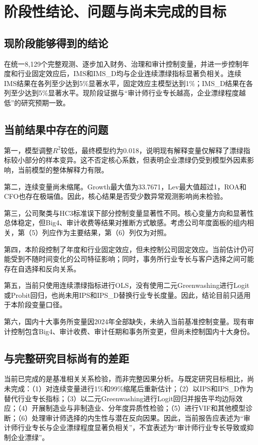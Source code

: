 \documentclass[UTF8,12pt,a4paper]{ctexart}
\begin{document}
\section{阶段性结论、问题与尚未完成的目标}

\subsection{现阶段能够得到的结论}

在统一8,129个完整观测、逐步加入财务、治理和审计控制变量，并进一步控制年度和行业固定效应后，IMS和IMS\_D均与企业连续漂绿指标显著负相关。连续IMS结果在各列至少达到5\%显著水平，固定效应主模型达到1\%；IMS\_D结果在各列至少达到5\%显著水平。现阶段证据与“审计师行业专长越高，企业漂绿程度越低”的研究预期一致。

\subsection{当前结果中存在的问题}

第一，模型调整$R^2$较低，最终模型约为0.018，说明现有解释变量仅解释了漂绿指标较小部分的样本变异。这不否定核心系数，但表明企业漂绿仍受到模型外因素影响，当前模型的整体解释力有限。

第二，连续变量尚未缩尾。Growth最大值为33.7671，Lev最大值超过1，ROA和CFO也存在极端值。因此，核心结果是否受少数异常观测影响尚未检验。

第三，公司聚类与HC3标准误下部分控制变量显著性不同。核心变量方向和显著性总体稳定，但Big4、审计收费等结果对推断方式敏感。考虑公司年度面板的组内相关，第（5）列应作为主要结果，第（6）列仅为对照。

第四，本阶段控制了年度和行业固定效应，但未控制公司固定效应。当前估计仍可能受到不随时间变化的公司特征影响；同时，事务所行业专长与客户选择之间可能存在自选择和反向关系。

第五，当前只使用连续漂绿指标进行OLS，没有使用二元Greenwashing进行Logit或Probit回归，也尚未用IPS和IPS\_D替换行业专长度量。因此，结论目前只适用于本阶段变量口径。

第六，国内十大事务所变量因2024年全部缺失，未纳入当前基准控制变量。现有审计控制包含Big4、审计收费、审计任期和事务所变更，但尚未控制国内十大身份。

\subsection{与完整研究目标尚有的差距}

当前已完成的是基准相关关系检验，而非完整因果分析。与既定研究目标相比，尚未完成：（1）对连续变量进行1\%和99\%缩尾后重新估计；（2）以IPS和IPS\_D作为替代行业专长指标；（3）以二元Greenwashing进行Logit回归并报告平均边际效应；（4）开展制造业与非制造业、分年度异质性检验；（5）进行VIF和其他模型诊断；（6）处理审计师选择的内生性与潜在反向因果。因此，当前报告应表述为“审计师行业专长与企业漂绿程度显著负相关”，不宜表述为“审计师行业专长导致或抑制企业漂绿”。
\end{document}
